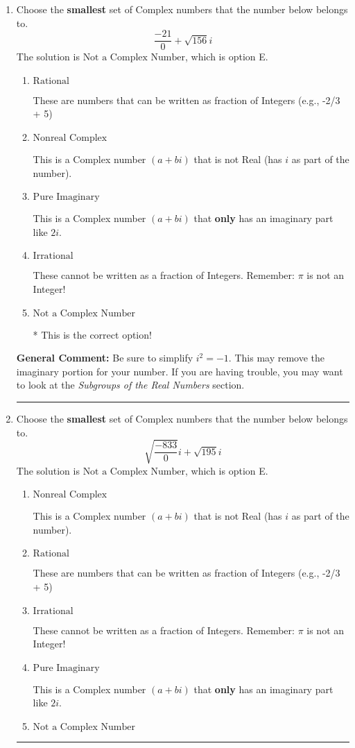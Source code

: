 \documentclass{extbook}[14pt]
\newcommand{\litem}[1]{\item #1

\rule{\textwidth}{0.4pt}}
\begin{document}
\begin{enumerate}\litem{
Choose the \textbf{smallest} set of Complex numbers that the number below belongs to.
\[ \frac{-21}{0}+\sqrt{156} i \]The solution is \( \text{Not a Complex Number} \), which is option E.\begin{enumerate}[label=\Alph*.]
\item \( \text{Rational} \)

These are numbers that can be written as fraction of Integers (e.g., -2/3 + 5)
\item \( \text{Nonreal Complex} \)

This is a Complex number $(a+bi)$ that is not Real (has $i$ as part of the number).
\item \( \text{Pure Imaginary} \)

This is a Complex number $(a+bi)$ that \textbf{only} has an imaginary part like $2i$.
\item \( \text{Irrational} \)

These cannot be written as a fraction of Integers. Remember: $\pi$ is not an Integer!
\item \( \text{Not a Complex Number} \)

* This is the correct option!
\end{enumerate}

\textbf{General Comment:} Be sure to simplify $i^2 = -1$. This may remove the imaginary portion for your number. If you are having trouble, you may want to look at the \textit{Subgroups of the Real Numbers} section.
}
\litem{
Choose the \textbf{smallest} set of Complex numbers that the number below belongs to.
\[ \sqrt{\frac{-833}{0}} i+\sqrt{195}i \]The solution is \( \text{Not a Complex Number} \), which is option E.\begin{enumerate}[label=\Alph*.]
\item \( \text{Nonreal Complex} \)

This is a Complex number $(a+bi)$ that is not Real (has $i$ as part of the number).
\item \( \text{Rational} \)

These are numbers that can be written as fraction of Integers (e.g., -2/3 + 5)
\item \( \text{Irrational} \)

These cannot be written as a fraction of Integers. Remember: $\pi$ is not an Integer!
\item \( \text{Pure Imaginary} \)

This is a Complex number $(a+bi)$ that \textbf{only} has an imaginary part like $2i$.
\item \( \text{Not a Complex Number} \)


\end{enumerate}}
\end{enumerate}
\end{document}
